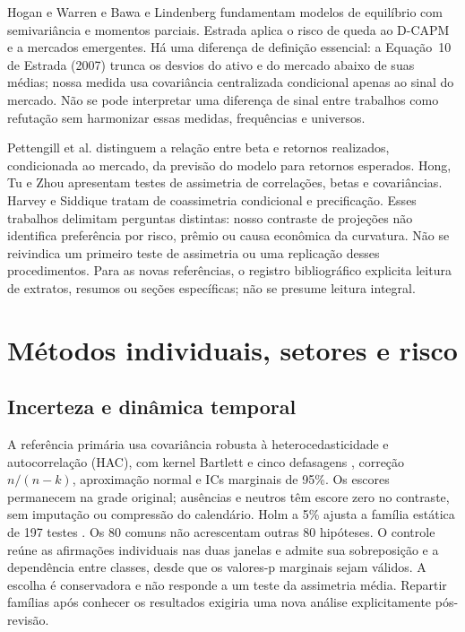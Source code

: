 Hogan e Warren \cite{hogan1974} e Bawa e Lindenberg \cite{bawa1977}
fundamentam modelos de equilíbrio com semivariância e momentos parciais.
Estrada \cite{estrada2002,estrada2007} aplica o risco de queda ao
D-CAPM e a mercados emergentes. Há uma diferença de definição essencial:
a Equação~10 de Estrada (2007) trunca os desvios do ativo e do mercado
abaixo de suas médias; nossa medida usa covariância centralizada
condicional apenas ao sinal do mercado. Não se pode interpretar uma
diferença de sinal entre trabalhos como refutação sem harmonizar essas
medidas, frequências e universos.

Pettengill et al. \cite{pettengill1995} distinguem a relação entre beta
e retornos realizados, condicionada ao mercado, da previsão do modelo
para retornos esperados. Hong, Tu e Zhou \cite{hong2007} apresentam
testes de assimetria de correlações, betas e covariâncias. Harvey e
Siddique \cite{harvey2000} tratam de coassimetria condicional e
precificação. Esses trabalhos delimitam perguntas distintas: nosso
contraste de projeções não identifica preferência por risco, prêmio
ou causa econômica da curvatura. Não se reivindica um primeiro teste
de assimetria ou uma replicação desses procedimentos. Para as novas
referências, o registro bibliográfico explicita leitura de extratos,
resumos ou seções específicas; não se presume leitura integral.

\section{Métodos individuais, setores e risco}
\subsection{Incerteza e dinâmica temporal}
A referência primária usa covariância robusta à heterocedasticidade e
autocorrelação (HAC), com kernel Bartlett e cinco defasagens
\cite{neweywest1987}, correção $n/(n-k)$, aproximação normal e ICs
marginais de 95\%. Os escores permanecem na grade original; ausências
e neutros têm escore zero no contraste, sem imputação ou compressão
do calendário. Holm a 5\% ajusta a família estática de 197 testes
\cite{holm1979}. Os 80 comuns não acrescentam outras 80 hipóteses.
O controle reúne as afirmações individuais nas duas janelas e admite
sua sobreposição e a dependência entre classes, desde que os valores-p
marginais sejam válidos. A escolha é conservadora e não responde a um
teste da assimetria média. Repartir famílias após conhecer os resultados
exigiria uma nova análise explicitamente pós-revisão.

